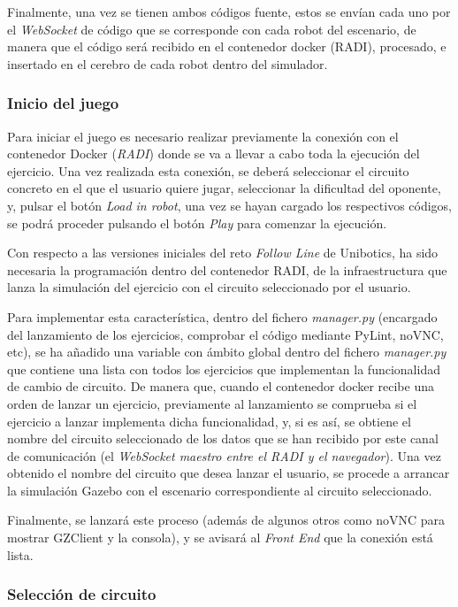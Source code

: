 \documentclass[a4paper, 12pt]{book}
\begin{document}
Finalmente, una vez se tienen ambos códigos fuente, estos se envían cada uno por el \emph{WebSocket} de código que se corresponde con cada robot del escenario, de manera que el código será recibido en el contenedor docker (RADI), procesado, e insertado en el cerebro de cada robot dentro del simulador. 

\subsubsection{Inicio del juego}
\label{subsec:follow_line_game_inicio}

Para iniciar el juego es necesario realizar previamente la conexión con el contenedor Docker (\emph{RADI}) donde se va a llevar a cabo toda la ejecución del ejercicio. Una vez realizada esta conexión, se deberá seleccionar el circuito concreto en el que el usuario quiere jugar, seleccionar la dificultad del oponente, y, pulsar el botón \emph{Load in robot}, una vez se hayan cargado los respectivos códigos, se podrá proceder pulsando el botón \emph{Play} para comenzar la ejecución.

Con respecto a las versiones iniciales del reto \emph{Follow Line} de Unibotics, ha sido necesaria la programación dentro del contenedor RADI, de la infraestructura que lanza la simulación del ejercicio con el circuito seleccionado por el usuario.

Para implementar esta característica, dentro del fichero \emph{manager.py} (encargado del lanzamiento de los ejercicios, comprobar el código mediante PyLint, noVNC, etc), se ha añadido una variable con ámbito global dentro del fichero \emph{manager.py} que contiene una lista con todos los ejercicios que implementan la funcionalidad de cambio de circuito. De manera que, cuando el contenedor docker recibe una orden de lanzar un ejercicio, previamente al lanzamiento se comprueba si el ejercicio a lanzar implementa dicha funcionalidad, y, si es así, se obtiene el nombre del circuito seleccionado de los datos que se han recibido por este canal de comunicación (el \emph{WebSocket maestro entre el RADI y el navegador}). Una vez obtenido el nombre del circuito que desea lanzar el usuario, se procede a arrancar la simulación Gazebo con el escenario correspondiente al circuito seleccionado.

Finalmente, se lanzará este proceso (además de algunos otros como noVNC para mostrar GZClient y la consola), y se avisará al \emph{Front End} que la conexión está lista.

\subsubsection{Selección de circuito}
\label{subsec:follow_line_game_circuito}
\end{document}
